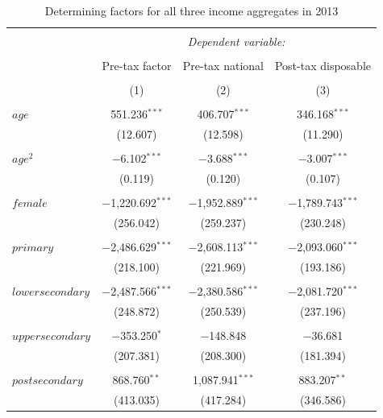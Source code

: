 \documentclass[a4paper]{article}\usepackage[]{graphicx}\usepackage[]{color}
\begin{document}
\begin{table}[H] \centering 
  \caption{Determining factors for all three income aggregates in 2013} 
  \label{ols2013} 
\begin{tabular}{@{\extracolsep{5pt}}lccc} 
\\[-1.8ex]\hline 
\hline \\[-1.8ex] 
 & \multicolumn{3}{c}{\textit{Dependent variable:}} \\ 
\cline{2-4} 
\\[-1.8ex] & Pre-tax factor & Pre-tax national & Post-tax disposable \\ 
\\[-1.8ex] & (1) & (2) & (3)\\ 
\hline \\[-1.8ex] 
 $age$ & 551.236$^{***}$ & 406.707$^{***}$ & 346.168$^{***}$ \\ 
  & (12.607) & (12.598) & (11.290) \\ 
  & & & \\ 
 $age^2$ & $-$6.102$^{***}$ & $-$3.688$^{***}$ & $-$3.007$^{***}$ \\ 
  & (0.119) & (0.120) & (0.107) \\ 
  & & & \\ 
 $female$ & $-$1,220.692$^{***}$ & $-$1,952.889$^{***}$ & $-$1,789.743$^{***}$ \\ 
  & (256.042) & (259.237) & (230.248) \\ 
  & & & \\ 
 $primary$ & $-$2,486.629$^{***}$ & $-$2,608.113$^{***}$ & $-$2,093.060$^{***}$ \\ 
  & (218.100) & (221.969) & (193.186) \\ 
  & & & \\ 
 $lower secondary$ & $-$2,487.566$^{***}$ & $-$2,380.586$^{***}$ & $-$2,081.720$^{***}$ \\ 
  & (248.872) & (250.539) & (237.196) \\ 
  & & & \\ 
 $upper secondary$ & $-$353.250$^{*}$ & $-$148.848 & $-$36.681 \\ 
  & (207.381) & (208.300) & (181.394) \\ 
  & & & \\ 
 $post secondary$ & 868.760$^{**}$ & 1,087.941$^{***}$ & 883.207$^{**}$ \\ 
  & (413.035) & (417.284) & (346.586) \\ 

\end{tabular}
\end{table}
\end{document}

